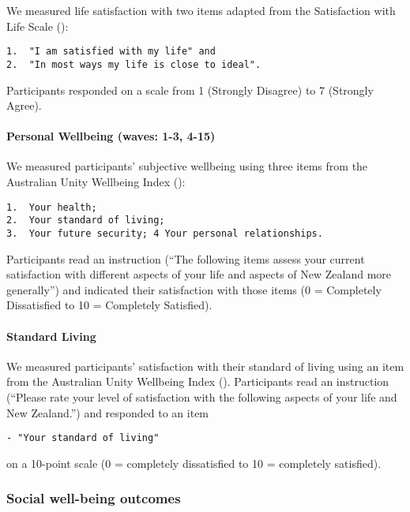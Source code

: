 \documentclass[
  singlecolumn,
  9pt]{article}
\let\oldparagraph\paragraph
\renewcommand{\paragraph}[1]{\oldparagraph{#1}\mbox{}}
\begin{document}
We measured life satisfaction with two items adapted from the
Satisfaction with Life Scale ():

\begin{verbatim}
1.  "I am satisfied with my life" and
2.  "In most ways my life is close to ideal".
\end{verbatim}

Participants responded on a scale from 1 (Strongly Disagree) to 7
(Strongly Agree).

\paragraph{Personal Wellbeing (waves: 1-3,
4-15)}\label{personal-wellbeing-waves-1-3-4-15}

We measured participants' subjective wellbeing using three items from
the Australian Unity Wellbeing Index
():

\begin{verbatim}
1.  Your health;
2.  Your standard of living;
3.  Your future security; 4 Your personal relationships.
\end{verbatim}

Participants read an instruction (``The following items assess your
current satisfaction with different aspects of your life and aspects of
New Zealand more generally'') and indicated their satisfaction with
those items (0 = Completely Dissatisfied to 10 = Completely Satisfied).

\paragraph{Standard Living}\label{standard-living}

We measured participants' satisfaction with their standard of living
using an item from the Australian Unity Wellbeing Index
().
Participants read an instruction (``Please rate your level of
satisfaction with the following aspects of your life and New Zealand.'')
and responded to an item

\begin{verbatim}
- "Your standard of living"
\end{verbatim}

on a 10-point scale (0 = completely dissatisfied to 10 = completely
satisfied).

\subsubsection{Social well-being
outcomes}\label{social-well-being-outcomes}
\end{document}
